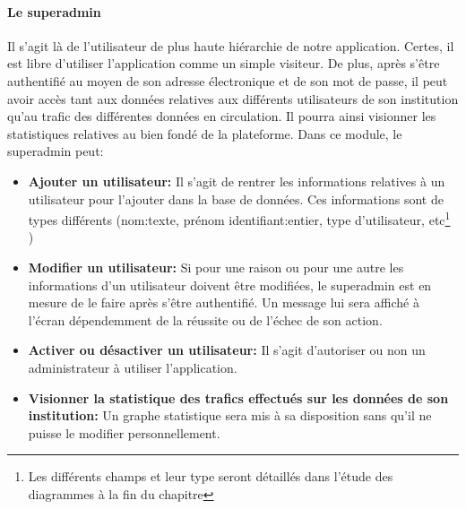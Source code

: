         \paragraph{Le superadmin}
        Il s'agit là de l'utilisateur de plus haute hiérarchie de notre application. Certes, il est libre 
        d'utiliser l'application comme un simple visiteur. De plus, après s'être authentifié au moyen de 
        son adresse électronique et de son mot de passe, il peut avoir accès tant aux données relatives aux
        différents utilisateurs de son institution qu'au trafic des différentes données en circulation. Il 
        pourra ainsi visionner les statistiques relatives au bien fondé de la plateforme.
        Dans ce module, le superadmin peut:
        \begin{itemize}
                \item \textbf{Ajouter un utilisateur: }
                Il s'agit de rentrer les informations relatives à un utilisateur pour l'ajouter dans la base de données.
                Ces informations sont de types différents (nom:texte, prénom identifiant:entier, type d'utilisateur, 
                etc\footnote{Les différents champs et leur type seront 
                détaillés dans l'étude des diagrammes à la fin du chapitre} )
                \item \textbf{Modifier un utilisateur: }
                Si pour une raison ou pour une autre les informations d'un utilisateur doivent être modifiées, le superadmin est en
                mesure de le faire après s'être authentifié. Un message lui sera affiché à l'écran dépendemment 
                de la réussite ou de l'échec de son action.
                \item \textbf{Activer ou désactiver un utilisateur: }
                Il s'agit d'autoriser ou non un administrateur à utiliser l'application.
                \item \textbf{Visionner la statistique des trafics effectués sur les données de son institution: }
                Un graphe statistique sera mis à sa disposition sans qu'il ne puisse le modifier personnellement.
        \end{itemize}
          

